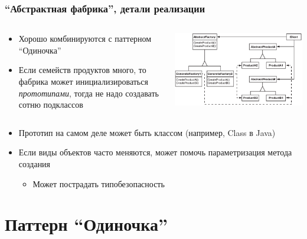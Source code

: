 \documentclass[xetex,mathserif,serif]{beamer}
\begin{document}
	\begin{frame}
		\frametitle{``Абстрактная фабрика'', детали реализации}
		\begin{columns}
			\begin{column}{0.5\textwidth}
				\begin{itemize}
					\item Хорошо комбинируются с паттерном ``Одиночка''
					\item Если семейств продуктов много, то фабрика может инициализироваться \textit{прототипами}, тогда не надо создавать сотню подклассов
				\end{itemize}
			\end{column}
			\begin{column}{0.5\textwidth}
				\begin{center}
					\includegraphics[width=\textwidth]{abstractFactory.png}
				\end{center}
			\end{column}
		\end{columns}
		\begin{itemize}
			\item Прототип на самом деле может быть классом (например, Class в Java)
			\item Если виды объектов часто меняются, может помочь параметризация метода создания
			\begin{itemize}
				\item Может пострадать типобезопасность
			\end{itemize}
		\end{itemize}
	\end{frame}

	\section{Паттерн ``Одиночка''}
\end{document}
